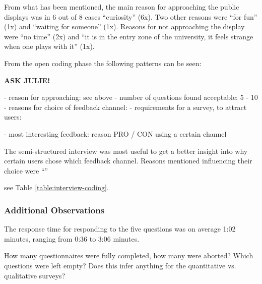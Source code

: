 	From what has been mentioned, the main reason for approaching the public displays was in 6 out of 8 cases ``curiosity'' (6x). Two other reasons were ``for fun'' (1x) and ``waiting for someone'' (1x). Reasons for not approaching the display were ``no time'' (2x) and ``it is in the entry zone of the university, it feels strange when one plays with it'' (1x).

	From the open coding phase the following patterns can be seen: 

		\textbf{ASK JULIE!}

		- reason for approaching: see above
		- number of questions found acceptable: 5 - 10
		- reasons for choice of feedback channel: 
		- requirements for a survey, to attract users: 

		- most interesting feedback: reason PRO / CON using a certain channel

	The semi-structured interview was most useful to get a better insight into why certain users chose which feedback channel. Reasons mentioned influencing their choice were ``''
	
	see Table \ref{table:interview-coding}.





	\subsubsection{Additional Observations}

	The response time for responding to the five questions was on average 1:02 minutes, ranging from 0:36 to 3:06 minutes.

	How many questionnaires were fully completed, how many were aborted? Which questions were left empty? Does this infer anything for the quantitative vs. qualitative surveys?

